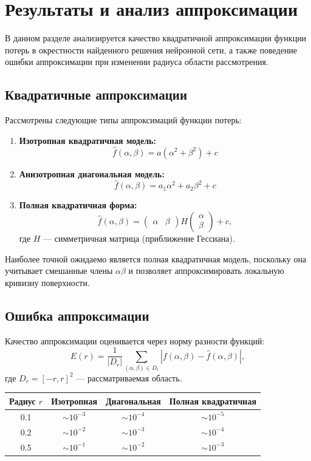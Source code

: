 \documentclass[12pt,a4paper]{article}
\begin{document}
\section{Результаты и анализ аппроксимации}

В данном разделе анализируется качество квадратичной аппроксимации функции потерь в окрестности найденного решения нейронной сети, а также поведение ошибки аппроксимации при изменении радиуса области рассмотрения.

\subsection{Квадратичные аппроксимации}

Рассмотрены следующие типы аппроксимаций функции потерь:
\begin{enumerate}
    \item \textbf{Изотропная квадратичная модель:}
    \[
        \hat{f}(\alpha, \beta) = a(\alpha^2 + \beta^2) + c
    \]
    \item \textbf{Анизотропная диагональная модель:}
    \[
        \hat{f}(\alpha, \beta) = a_1 \alpha^2 + a_2 \beta^2 + c
    \]
    \item \textbf{Полная квадратичная форма:}
    \[
        \hat{f}(\alpha, \beta)
        =
        \begin{pmatrix} \alpha & \beta \end{pmatrix}
        H
        \begin{pmatrix} \alpha \\ \beta \end{pmatrix}
        + c,
    \]
    где $H$ --- симметричная матрица (приближение Гессиана).
\end{enumerate}

Наиболее точной ожидаемо является полная квадратичная модель, поскольку она учитывает смешанные члены $\alpha \beta$ и позволяет аппроксимировать локальную кривизну поверхности.

\subsection{Ошибка аппроксимации}
Качество аппроксимации оценивается через норму разности функций:
\[
    E(r)
    =
    \frac{1}{|D_r|}
    \sum_{(\alpha,\beta)\in D_r}
    \left| f(\alpha,\beta) - \hat{f}(\alpha,\beta) \right|,
\]
где $D_r = [-r,r]^2$ --- рассматриваемая область.

\begin{center}
\begin{tabular}{c|c|c|c}
\toprule
Радиус $r$ & Изотропная & Диагональная & Полная квадратичная \\
\midrule
0.1 & $\sim 10^{-3}$ & $\sim 10^{-4}$ & $\sim 10^{-5}$ \\
0.2 & $\sim 10^{-2}$ & $\sim 10^{-3}$ & $\sim 10^{-4}$ \\
0.5 & $\sim 10^{-1}$ & $\sim 10^{-2}$ & $\sim 10^{-3}$ \\
\bottomrule
\end{tabular}
\end{center}
\end{document}
